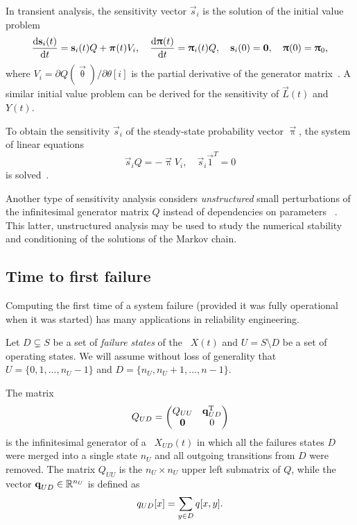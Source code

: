In transient analysis, the sensitivity vector $\vec{s}_i$ is the
solution of the initial value problem
\begin{equation}
  \frac{\mathrm{d} \bm{\mathrm{s}}_i(t)}{\mathrm{d} t} = \bm{\mathrm{s}}_i(t) Q + \bm{\mathrm{\pi}}(t) V_i,
  \quad \frac{\mathrm{d} \bm{\mathrm{\uppi}}(t)}{\mathrm{d} t} = \bm{\mathrm{\uppi}}_i(t) Q,
  \quad \bm{\mathrm{s}}_i(0) = \bm{\mathrm{0}}, \quad \bm{\mathrm{\uppi}}(0) = \bm{\mathrm{\uppi}}_0
  \text,
\end{equation}
where $V_i = \partial Q(\vec{\uptheta}) / \partial \theta[i]$ is the
partial derivative of the generator
matrix~\citep{DBLP:conf/sigmetrics/RameshT93}. A similar initial value
problem can be derived for the sensitivity of $\vec{L}(t)$ and $Y(t)$.

To obtain the sensitivity $\vec{s}_i$ of the steady-state probability
vector $\vec{\uppi}$, the system of linear equations
\begin{equation}
  \label{eq:background:ctmc:sensitvity:s}
  \vec{s}_i Q = -\vec{\uppi} V_i, \quad \vec{s}_i \vec{1}^T = 0
\end{equation}
is solved~\citep{DBLP:conf/sigmetrics/BlakeRT88}.

Another type of sensitivity analysis considers \emph{unstructured}
small perturbations of the infinitesimal generator matrix $Q$ instead
of dependencies on parameters%
~\citep{funderlic1986sensitivity,ipsen1994uniform}. This latter,
unstructured analysis may be used to study the numerical stability and
conditioning of the solutions of the Markov chain.

\subsection{Time to first failure}
\label{ssec:background:mtff}

Computing the first time of a system failure (provided it was fully
operational when it was started) has many applications in reliability
engineering.

Let $D \subsetneq S$ be a set of \emph{failure states} of the \CTMC\ 
$X(t)$ and $U = S \setminus D$ be a set of operating states. We will
assume without loss of generality that $U = \{0, 1, \ldots, n_U - 1\}$
and $D = \{ n_U, n_U + 1, \ldots, n - 1 \}$.

The matrix
\begin{equation}
  Q_{UD} = \begin{pmatrix}
    Q_{UU} & \bm{\mathrm{q}}_{UD}^{\mathrm{T}} \\
    \bm{\mathrm{0}} & 0
  \end{pmatrix}
\end{equation}
is the infinitesimal generator of a \CTMC\ $X_{UD}(t)$ in which all
the failures states $D$ were merged into a single state $n_U$ and all
outgoing transitions from $D$ were removed. The matrix $Q_{UU}$ is the
$n_U \times n_U$ upper left submatrix of $Q$, while the vector
$\bm{\mathrm{q}}_{UD} \in \mathbb{R}^{n_U}$ is defined as
\begin{equation}
  q_{UD}[x] = \sum_{y \in D} q[x, y] \text.
\end{equation}


